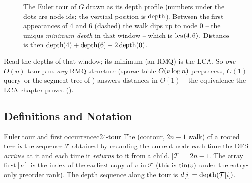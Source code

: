 \begin{figure}[H]
\centering
{}
\caption{The Euler tour of $G$ drawn as its depth profile (numbers under the dots are node
ids; the vertical position is $\operatorname{depth}$). Between the first appearances of $4$ and $6$
(dashed) the walk dips up to node $0$ -- the unique \emph{minimum depth} in that window --
which is $\operatorname{lca}(4,6)$. Distance is then $\operatorname{depth}(4)+\operatorname{depth}(6)-2\operatorname{depth}(0)$.}\label{fig:c24-tour}
\end{figure}

Read the depths of that window; its minimum (an RMQ) is the LCA. So \emph{one} $O(n)$ tour
plus \emph{any} RMQ structure (sparse table $O(n\log n)$ preprocess, $O(1)$ query, or
the segment tree of ) answers distances in $O(1)$ -- the equivalence the LCA
chapter proves ().

\subsection{Definitions and Notation}

\begin{definition}{Euler tour and first occurrence}{c24-tour}
The  (contour, $2n{-}1$ walk) of a rooted tree is the sequence
$\mathcal{T}$ obtained by recording the current node each time the DFS \emph{arrives} at it
and each time it \emph{returns} to it from a child. $|\mathcal{T}| = 2n-1$. The
 array $\mathrm{first}[v]$ is the index of the earliest copy of $v$
in $\mathcal{T}$ (this is $\operatorname{tin}(v)$ under the entry-only preorder rank). The depth sequence
along the tour is $d[i] = \operatorname{depth}(\mathcal{T}[i])$.
\end{definition}

